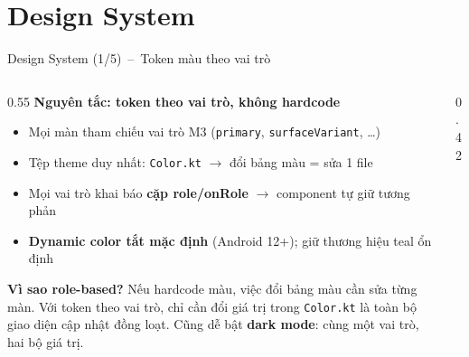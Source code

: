 \documentclass[aspectratio=169]{beamer}
\begin{document}
\section{Design System}
\begin{frame}{Design System (1/5)~--~Token màu theo vai trò}
  \begin{columns}
    \begin{column}{0.55\textwidth}
      {\small\textbf{Nguyên tắc: token theo vai trò, không hardcode}}\vspace{1mm}
      {\tiny
      \begin{itemize}\itemsep3pt
        \item Mọi màn tham chiếu vai trò M3 (\texttt{primary}, \texttt{surfaceVariant}, \ldots)
        \item Tệp theme duy nhất: \texttt{Color.kt} $\rightarrow$ đổi bảng màu = sửa 1 file
        \item Mọi vai trò khai báo \textbf{cặp role/onRole} $\rightarrow$ component tự giữ tương phản
        \item \textbf{Dynamic color tắt mặc định} (Android 12+); giữ thương hiệu teal ổn định
      \end{itemize}}\vspace{2mm}
      {\small\textbf{Vì sao role-based?}}\vspace{1mm}
      {\tiny Nếu hardcode màu, việc đổi bảng màu cần sửa từng màn. Với token theo vai trò, chỉ cần đổi giá trị trong \texttt{Color.kt} là toàn bộ giao diện cập nhật đồng loạt. Cũng dễ bật \textbf{dark mode}: cùng một vai trò, hai bộ giá trị.}
    \end{column}
    \begin{column}{0.42\textwidth}
\end{column}
\end{columns}
\end{frame}
\end{document}
